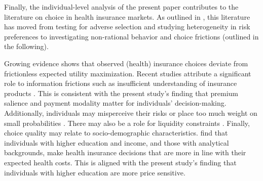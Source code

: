 \documentclass[a4paper, 11pt, english]{article}
\begin{document}
Finally, the individual-level analysis of the present paper contributes to the literature on choice in health insurance markets. 
As outlined in \citet{Spinnewijn2017}, this literature has moved from testing for adverse selection \citep{Chiappori1997, Chiappori2000, Cohen2010} and studying heterogeneity in risk preferences \citep{Cohen2007,Einav2010,Sydnor2010,Ericson2021} to investigating non-rational behavior and choice frictions (outlined in the following).  

Growing evidence shows that observed (health) insurance choices deviate from frictionless expected utility maximization.  %
Recent studies attribute a significant role to information frictions such as insufficient understanding of insurance products \citep{Abaluck2011, Loewenstein2013, Handel2015, Bhargava2017}. This is consistent with the present study's finding that premium salience and payment modality matter for individuals' decision-making.
Additionally, individuals may misperceive their risks or place too much weight on small probabilities \citep{Barseghyan2013}. There may also be a role for liquidity constraints \citep{Cole2013, casaburi2018time}. Finally, choice quality may relate to socio-demographic characteristics. \citet{HKMS2020} find that individuals with higher education and income, and those with analytical backgrounds, make health insurance decisions that are more in line with their expected health costs. This is aligned with the present study's finding that individuals with higher education are more price sensitive.
\end{document}
